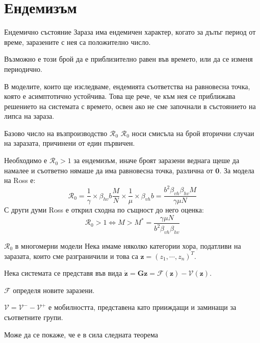 \section{Ендемизъм}
\begin{frame}[t]{Ендемично състояние}
  Зараза има ендемичен характер, когато за дълъг период от време, заразените с нея са положително число.

  Възможно е този брой да е приблизително равен във времето, или да се изменя периодично.

  В моделите, които ще изследваме, ендемията съответства на равновесна точка, която е асимптотично устойчива. Това ще рече, че към нея се приближава решението на системата с времето, освен ако не сме започнали в състоянието на липса на зараза.
\end{frame}

\begin{frame}[t]{Базово число на възпроизводство $\mathscr{R}_0$}
  $\mathscr{R}_0$ носи смисъла на брой вторични случаи на заразата, причинени от един първичен.
  
  Необходимо е $\mathscr{R}_0 > 1$ за ендемизъм,
  иначе броят заразени веднага щеше да намалее и съответно нямаше да има равновесна точка, различна от $\boldsymbol{0}$. За модела на Ross е:
  \begin{equation}
    \mathscr{R}_0 = \frac{1}{\gamma} \times \beta_{hv} b \frac{M}{N} \times \frac{1}{\mu} \times \beta_{vh} b = \frac{b^2 \beta_{vh} \beta_{hv} M}{\gamma \mu N}
  \end{equation}
  С други думи Ross е открил сходна по същност до него оценка:
  \begin{equation}
    \mathscr{R}_0 > 1 \iff M > M^* = \frac{\gamma \mu N}{b^2 \beta_{vh} \beta_{hv}}
  \end{equation}
\end{frame}

\begin{frame}[t]{$\mathscr{R}_0$ в многомерни модели}
  Нека имаме няколко категории хора, податливи на заразата, които сме разграничили и това са $\boldsymbol{z} = (z_1, \cdots, z_n)^T$.

  Нека системата се представя във вида $\dot{\boldsymbol{z}} = \boldsymbol{G}{\boldsymbol{z}} = \mathscr{F}(\boldsymbol{z}) - \mathscr{V}(\boldsymbol{z})$.
  
  $\mathscr{F}$ определя новите заразени.
  
  $\mathscr{V} = \mathscr{V}^- - \mathscr{V}^+$ е мобилността, представена като прииждащи и заминащи за съответните групи.

  Може да се покаже, че е в сила следната теорема
\end{frame}

